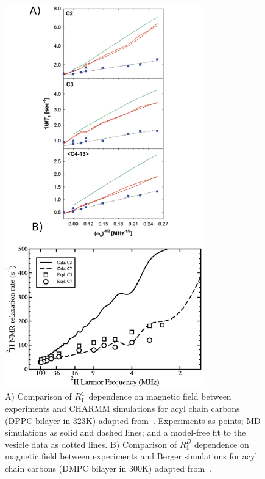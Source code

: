 \documentclass[aps,prl,superscriptaddress,twocolumn]{revtex4}
\begin{document}
\begin{figure}[]
  \includegraphics[width=8.6cm]{../Fig/Rdispersion.eps}
\newline
  \caption{\label{Rdispersion}
    A) Comparison of $R_1^{C}$ dependence on magnetic field between experiments and CHARMM simulations for acyl chain carbons (DPPC bilayer in 323K) adapted from~\cite{klauda08a}.
    Experiments as points; MD simulations as solid and dashed lines; and a model-free fit to the vesicle data as dotted lines. 
    B) Comparison of $R_1^{D}$ dependence on magnetic field between experiments and Berger simulations for acyl chain carbons (DMPC bilayer in 300K) adapted from~\cite{wohlert06}.
  } 
\end{figure}
\end{document}
